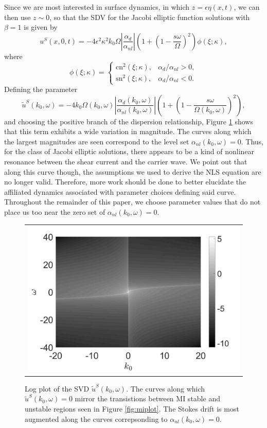 \documentclass{JFM_Style/jfm}
\newcommand{\ba}{\begin{array}}
\newcommand{\ea}{\end{array}}
\begin{document}
Since we are most interested in surface dynamics, in which $z=\epsilon\eta(x,t)$, we can then use $z\sim 0$, so that the SDV for the Jacobi elliptic function solutions with $\beta=1$ is given by
\[
u^{S}(x,0,t) = -4\epsilon^{2}\kappa^{2}k_{0}\Omega \left|\frac{\alpha_{d}}{\alpha_{nl}}\right| \left(1 + \left(1 - \frac{s\omega}{\Omega} \right)^{2} \right)\phi(\xi;\kappa),
\]
where
\[
\phi(\xi;\kappa) = \left\{\ba{rl} \mbox{cn}^2(\xi;\kappa), & \alpha_{d}/\alpha_{nl}>0, \\  \mbox{sn}^2(\xi;\kappa), & \alpha_{d}/\alpha_{nl}<0.\ea \right.
\]
Defining the parameter
\[
\tilde{u}^{S}(k_{0},\omega) = -4 k_{0}\Omega(k_{0},\omega) \left|\frac{\alpha_{d}(k_{0},\omega)}{\alpha_{nl}(k_{0},\omega)}\right|\left(1 + \left(1 - \frac{s\omega}{\Omega(k_{0},\omega)} \right)^{2} \right),
\]
and choosing the positive branch of the dispersion relationship, Figure \ref{fig:sdriftmag_sign} shows that this term exhibits a wide variation in magnitude.  The curves along which the largest magnitudes are seen correspond to the level set $\alpha_{nl}(k_{0},\omega)=0$.  Thus, for the class of Jacobi elliptic solutions, there appears to be a kind of nonlinear resonance between the shear current and the carrier wave.  We point out that along this curve though, the assumptions we used to derive the NLS equation are no longer valid.  Therefore, more work should be done to better elucidate the affiliated dynamics associated with parameter choices defining said curve.  Throughout the remainder of this paper, we choose parameter values that do not place us too near the zero set of $\alpha_{nl}(k_{0},\omega)=0$.
\begin{figure}
\centering
\begin{tabular}{c}
\includegraphics[width=.48\textwidth]{us_magnitude} 
\end{tabular}
\caption{\small Log plot of the SVD $\tilde{u}^{S}(k_{0},\omega)$.  The curves along which $\tilde{u}^{S}(k_{0},\omega)=0$ mirror the transistions between MI stable and unstable regions seen in Figure \ref{fig:miplot}.  The Stokes drift is most augmented along the curves correpsonding to $\alpha_{nl}(k_{0},\omega)=0$.  }
\label{fig:sdriftmag_sign}
\end{figure} 
\end{document}
